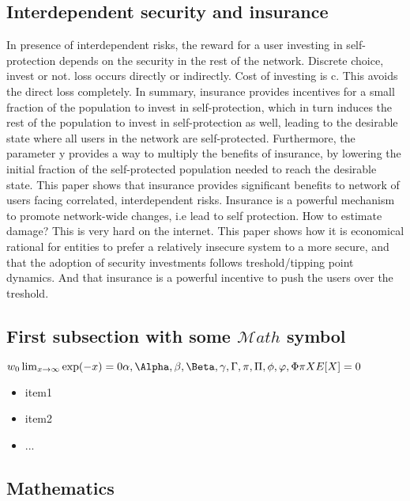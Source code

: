\subsection{Interdependent security and insurance}
In presence of interdependent risks, the reward for a user investing in self-protection depends on the security in the rest of the network.
Discrete choice, invest or not. loss occurs directly or indirectly. Cost of investing is c. This avoids the direct loss completely. 
In summary, insurance provides incentives for a
small fraction of the population to invest in self-protection, which in turn induces the rest
of the population to invest in self-protection as well, leading to the desirable state where
all users in the network are self-protected. Furthermore, the parameter y provides a way
to multiply the beneﬁts of insurance, by lowering the initial fraction of the self-protected
population needed to reach the desirable state.
This paper shows that insurance provides significant benefits to network of users facing correlated, interdependent risks. Insurance is a powerful mechanism to promote network-wide changes, i.e lead to self protection.
How to estimate damage? This is very hard on the internet. 
This paper shows how it is economical rational for entities to prefer a relatively insecure system to a more secure, and that the adoption of security investments follows treshold/tipping point dynamics. And that insurance is a powerful incentive to push the users over the treshold.

\subsection{First subsection with some \texorpdfstring{$\mathcal{M}ath$}{Math} symbol}\label{sec:first_ssection}
\begin{math} w_{0} \lim_{x \to \infty} \exp(-x) = 0 \alpha, \Alpha, \beta, \Beta, \gamma, \Gamma,
  \pi, \Pi, \phi, \varphi, \Phi  \pi 
  X E[X]=0 \end{math}
\blindtext
\begin{itemize}[topsep=-1em,parsep=0em,itemsep=0em] %
 \item item1
 \item item2
 \item ...
\end{itemize}

\subsection{Mathematics}



